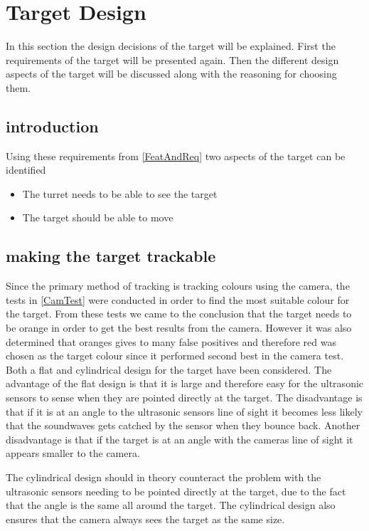 \section{Target Design}
In this section the design decisions of the target will be explained. First the
requirements of the target will be presented again. Then the different design
aspects of the target will be discussed along with the reasoning for choosing them.
\subsection{introduction}

Using these requirements from \autoref{FeatAndReq} two aspects of the target can be identified
\begin{itemize}
  \item The turret needs to be able to see the target
  \item The target should be able to move
\end{itemize}

\subsection{making the target trackable}
Since the primary method of tracking is tracking colours using the camera, the
tests in \autoref{CamTest} were conducted in order to find the most suitable
colour for the target. From these tests we came to the conclusion that the target
needs to be orange in order to get the best results from the camera. However it
was also determined that oranges gives to many false positives and therefore red
was chosen as the target colour since it performed second best in the camera test.
\nl
Both a flat and cylindrical design for the target have been considered. The
advantage of the flat design is that it is large and therefore easy for the ultrasonic
sensors to sense when they are pointed directly at the target. The disadvantage
is that if it is at an angle to the ultrasonic sensors line of sight it
becomes less likely that the soundwaves gets catched by the sensor when they
bounce back. Another disadvantage is that if the target is at an angle with the
cameras line of sight it appears smaller to the camera.\nl

The cylindrical design should in theory counteract the problem with the
ultrasonic sensors needing to be pointed directly at the target, due to the
fact that the angle is the same all around the target. The cylindrical design
also ensures that the camera always sees the target as the same size.\nl

